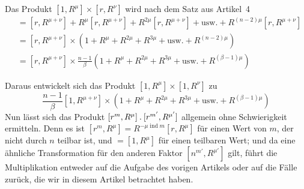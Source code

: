 \clearpage
{}
Das Produkt $[1,R^\mu]\times[r,R^\nu]$ wird nach dem Satz aus Artikel~4
\[
\begin{aligned}
&=[r,R^{\mu+\nu}]+R^\mu[r,R^{\mu+\nu}]+R^{2\mu}[r,R^{\mu+\nu}]+\text{usw.}+R^{(n-2)\mu}[r,R^{\mu+\nu}]\\
&=[r,R^{\mu+\nu}]\times(1+R^\mu+R^{2\mu}+R^{3\mu}+\text{usw.}+R^{(n-2)\mu})\\
&=[r,R^{\mu+\nu}]\times\frac{n-1}\beta(1+R^\mu+R^{2\mu}+R^{3\mu}+\text{usw.}+R^{(\beta-1)\mu})
\end{aligned}
\]

Daraus entwickelt sich das Produkt $[1,R^\mu]\times[1,R^\nu]$ zu
\[
\frac{n-1}\beta[1,R^{\mu+\nu}]\times(1+R^\mu+R^{2\mu}+R^{3\mu}+\text{usw.}+R^{(\beta-1)\mu})
\]
Nun lässt sich das Produkt $[r^m,R^\mu]\mathbin{.}[r^{m'},R^{\mu'}]$ allgemein ohne Schwierigkeit ermitteln. Denn es ist $[r^m,R^\mu]=R^{-\mu\operatorname{ind}m}[r,R^\mu]$ für einen Wert von $m$, der nicht durch $n$ teilbar ist, und $=[1,R^\mu]$ für einen teilbaren Wert; und da eine ähnliche Transformation für den anderen Faktor $[n^{m'},R^{\mu'}]$ gilt, führt die Multiplikation entweder auf die Aufgabe des vorigen Artikels oder auf die Fälle zurück, die wir in diesem Artikel betrachtet haben.
